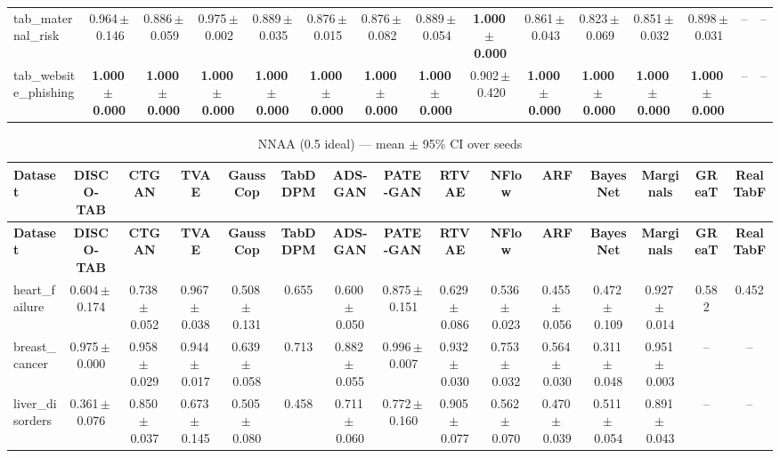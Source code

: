 \documentclass[8pt]{extarticle}
\begin{document}
\begin{longtable}{l*{14}{c}}
tab\_maternal\_risk & 0.964\,$\pm$\,0.146 & 0.886\,$\pm$\,0.059 & 0.975\,$\pm$\,0.002 & 0.889\,$\pm$\,0.035 & 0.876\,$\pm$\,0.015 & 0.876\,$\pm$\,0.082 & 0.889\,$\pm$\,0.054 & \textbf{1.000\,$\pm$\,0.000} & 0.861\,$\pm$\,0.043 & 0.823\,$\pm$\,0.069 & 0.851\,$\pm$\,0.032 & 0.898\,$\pm$\,0.031 & -- & -- \\
tab\_website\_phishing & \textbf{1.000\,$\pm$\,0.000} & \textbf{1.000\,$\pm$\,0.000} & \textbf{1.000\,$\pm$\,0.000} & \textbf{1.000\,$\pm$\,0.000} & \textbf{1.000\,$\pm$\,0.000} & \textbf{1.000\,$\pm$\,0.000} & \textbf{1.000\,$\pm$\,0.000} & 0.902\,$\pm$\,0.420 & \textbf{1.000\,$\pm$\,0.000} & \textbf{1.000\,$\pm$\,0.000} & \textbf{1.000\,$\pm$\,0.000} & \textbf{1.000\,$\pm$\,0.000} & -- & -- \\
\end{longtable}
\begin{longtable}{l*{14}{c}}
\caption{NNAA (0.5 ideal) --- mean $\pm$ 95\% CI over seeds}\\
\toprule
\textbf{Dataset} & \textbf{DISCO-TAB} & \textbf{CTGAN} & \textbf{TVAE} & \textbf{GaussCop} & \textbf{TabDDPM} & \textbf{ADS-GAN} & \textbf{PATE-GAN} & \textbf{RTVAE} & \textbf{NFlow} & \textbf{ARF} & \textbf{BayesNet} & \textbf{Marginals} & \textbf{GReaT} & \textbf{RealTabF} \\
\midrule
\endfirsthead
\toprule
\textbf{Dataset} & \textbf{DISCO-TAB} & \textbf{CTGAN} & \textbf{TVAE} & \textbf{GaussCop} & \textbf{TabDDPM} & \textbf{ADS-GAN} & \textbf{PATE-GAN} & \textbf{RTVAE} & \textbf{NFlow} & \textbf{ARF} & \textbf{BayesNet} & \textbf{Marginals} & \textbf{GReaT} & \textbf{RealTabF} \\
\midrule
\endhead
\bottomrule
\endfoot
heart\_failure & 0.604\,$\pm$\,0.174 & 0.738\,$\pm$\,0.052 & 0.967\,$\pm$\,0.038 & 0.508\,$\pm$\,0.131 & 0.655 & 0.600\,$\pm$\,0.050 & 0.875\,$\pm$\,0.151 & 0.629\,$\pm$\,0.086 & 0.536\,$\pm$\,0.023 & 0.455\,$\pm$\,0.056 & 0.472\,$\pm$\,0.109 & 0.927\,$\pm$\,0.014 & 0.582 & 0.452 \\
breast\_cancer & 0.975\,$\pm$\,0.000 & 0.958\,$\pm$\,0.029 & 0.944\,$\pm$\,0.017 & 0.639\,$\pm$\,0.058 & 0.713 & 0.882\,$\pm$\,0.055 & 0.996\,$\pm$\,0.007 & 0.932\,$\pm$\,0.030 & 0.753\,$\pm$\,0.032 & 0.564\,$\pm$\,0.030 & 0.311\,$\pm$\,0.048 & 0.951\,$\pm$\,0.003 & -- & -- \\
liver\_disorders & 0.361\,$\pm$\,0.076 & 0.850\,$\pm$\,0.037 & 0.673\,$\pm$\,0.145 & 0.505\,$\pm$\,0.080 & 0.458 & 0.711\,$\pm$\,0.060 & 0.772\,$\pm$\,0.160 & 0.905\,$\pm$\,0.077 & 0.562\,$\pm$\,0.070 & 0.470\,$\pm$\,0.039 & 0.511\,$\pm$\,0.054 & 0.891\,$\pm$\,0.043 & -- & -- \\

\end{longtable}
\end{document}
